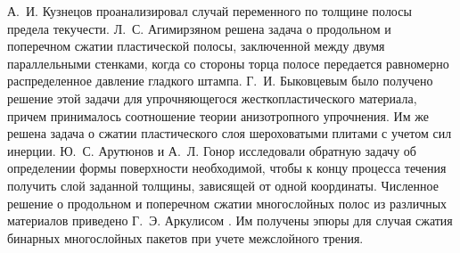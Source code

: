 А.~И. Кузнецов \autocite{Kuznetsov:1960} проанализировал случай переменного по толщине полосы предела текучести.
Л.~С. Агимирзяном \autocite{Agamirzyan:1962} решена задача о продольном и поперечном сжатии пластической полосы, заключенной между двумя параллельными стенками, когда со стороны торца полосе передается равномерно распределенное давление гладкого штампа.
Г.~И. Быковцевым \autocite{Bikovcev:1964} было получено решение этой задачи для упрочняющегося жесткопластического материала, причем принималось соотношение теории анизотропного упрочнения. Им же \autocite{Bikovcev:1960} решена задача о сжатии пластического слоя шероховатыми плитами с учетом сил инерции.
Ю.~С. Арутюнов и А.~Л. Гонор \autocite{Arutyunov:1963} исследовали обратную задачу об определении формы поверхности необходимой, чтобы к концу процесса течения получить слой заданной толщины, зависящей от одной координаты.
Численное решение о продольном и поперечном сжатии многослойных полос из различных материалов приведено Г.~Э. Аркулисом \autocite{Arkulis:1964}. Им получены эпюры для случая сжатия бинарных многослойных пакетов при учете межслойного трения.

